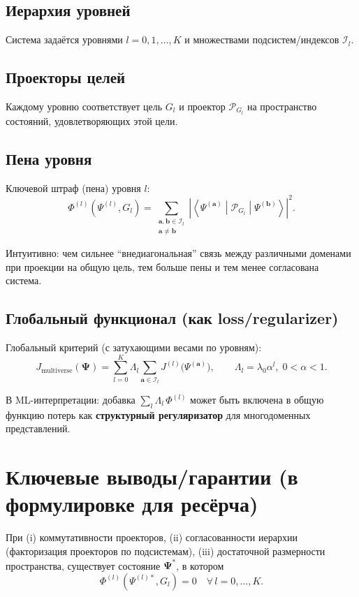 \documentclass[11pt]{article}
\begin{document}
\subsection{Иерархия уровней}

Система задаётся уровнями $l=0,1,\dots,K$ и множествами подсистем/индексов $\mathcal{I}_l$.

\subsection{Проекторы целей}

Каждому уровню соответствует цель $G_l$ и проектор $\mathcal{P}_{G_l}$ на пространство состояний, удовлетворяющих этой цели.

\subsection{Пена уровня}

Ключевой штраф (пена) уровня $l$:
\[
\Phi^{(l)}(\Psi^{(l)},G_l)
= \sum_{\substack{\mathbf{a},\mathbf{b}\in\mathcal{I}_l\\ \mathbf{a}\neq\mathbf{b}}}
\left|\left\langle \Psi^{(\mathbf{a})}\middle|\mathcal{P}_{G_l}\middle|\Psi^{(\mathbf{b})}\right\rangle\right|^2.
\]

Интуитивно: чем сильнее ``внедиагональная'' связь между различными доменами при проекции на общую цель, тем больше пены и тем менее согласована система.

\subsection{Глобальный функционал (как loss/regularizer)}

Глобальный критерий (с затухающими весами по уровням):
\[
J_{\text{multiverse}}(\mathbf{\Psi})
= \sum_{l=0}^{K} \Lambda_l \sum_{\mathbf{a}\in\mathcal{I}_l} J^{(l)}\bigl(\Psi^{(\mathbf{a})}\bigr),
\qquad \Lambda_l=\lambda_0\alpha^l,\; 0<\alpha<1.
\]

В ML-интерпретации: добавка $\sum_l \Lambda_l\,\Phi^{(l)}$ может быть включена в общую функцию потерь как \textbf{структурный регуляризатор} для многодоменных представлений.

\section{Ключевые выводы/гарантии (в формулировке для ресёрча)}

При (i) коммутативности проекторов, (ii) согласованности иерархии (факторизация проекторов по подсистемам), (iii) достаточной размерности пространства, существует состояние $\mathbf{\Psi}^*$, в котором
\[
\Phi^{(l)}(\Psi^{(l)*},G_l)=0 \quad \forall\, l=0,\dots,K.
\]
\end{document}
